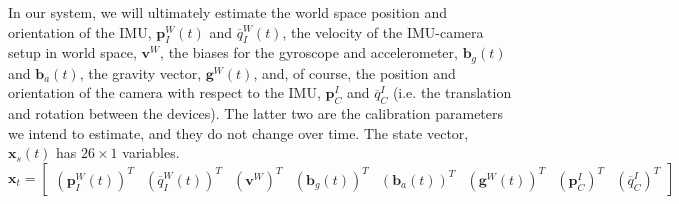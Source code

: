 \documentclass[letterpaper]{article}
\newcommand{\bb}[1]{\mathbf{#1}}
\begin{document}
In our system, we will ultimately estimate the world space position
and orientation of the IMU, $\bb{p}_I^W(t)$ and
${\overline{q}}_I^W(t)$, the velocity of the IMU-camera setup in world
space, $\bb{v}^W$, the biases for the gyroscope and accelerometer,
$\bb{b}_g(t)$ and $\bb{b}_a(t)$, the gravity vector, $\bb{g}^W(t)$,
and, of course, the position and orientation of the camera with
respect to the IMU, $\bb{p}_C^I$ and $\overline{q}_C^I$ (i.e. the
translation and rotation between the devices). The latter two are the
calibration parameters we intend to estimate, and they do not change
over time. The state vector, $\bb{x}_s(t)$ has $26 \times 1$
variables.
\begin{equation}
\bb{x}_t=\begin{bmatrix} (\bb{p}_I^W(t))^T & ({\overline{q}}_I^W(t))^T  & (\bb{v}^W)^T  & (\bb{b}_g(t))^T &  (\bb{b}_a(t))^T & (\bb{g}^W(t))^T  & (\bb{p}_C^I)^T & (\overline{q}_C^I)^T\end{bmatrix}
\label{eq:UKF-state}
\end{equation}
\end{document}

